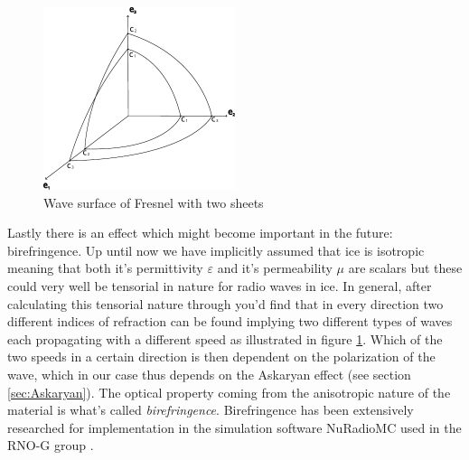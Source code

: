 \begin{figure}
  \centering
  \includegraphics[width=0.5\textwidth]{figures/Fresnel.pdf}
  \caption{Wave surface of Fresnel with two sheets}
  \label{fig:Fresnel}
\end{figure}
Lastly there is an effect which might become important in the future:
birefringence.  Up until now we have implicitly assumed that ice is isotropic
meaning that both it's permittivity $\varepsilon$ and it's permeability $\mu$
are scalars but these could very well be tensorial in nature for radio waves in
ice. In general, after calculating this tensorial nature through you'd find
that in every direction two different indices of refraction can be found
implying two different types of waves each propagating with a different speed
as illustrated in figure \ref{fig:Fresnel}. Which of the two speeds in a
certain direction is then dependent on the polarization of the wave, which in
our case thus depends on the Askaryan effect (see section \ref{sec:Askaryan}).
The optical property coming from the anisotropic nature of the material is
what's called \textit{birefringence}.  Birefringence has been extensively
researched for implementation in the simulation software NuRadioMC used in the
RNO-G group \cite{Heyer2023}.
